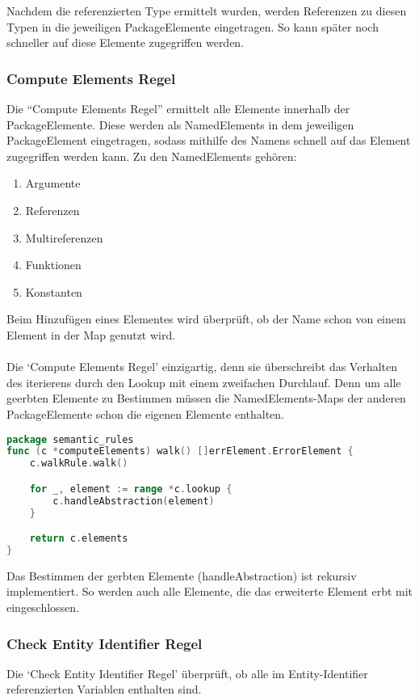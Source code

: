 \documentclass[./einleitung.tex]{subfiles}
\begin{document}
    Nachdem die referenzierten Type ermittelt wurden, werden Referenzen zu diesen Typen in die jeweiligen PackageElemente eingetragen.
    So kann später noch schneller auf diese Elemente zugegriffen werden.

    \subsubsection{Compute Elements Regel}
    Die ``Compute Elements Regel'' ermittelt alle Elemente innerhalb der PackageElemente.
    Diese werden als NamedElements in dem jeweiligen PackageElement eingetragen, sodass mithilfe des Namens schnell auf das Element zugegriffen werden kann.
    Zu den NamedElements gehören:
    \begin{enumerate}
        \item Argumente
        \item Referenzen
        \item Multireferenzen
        \item Funktionen
        \item Konstanten
    \end{enumerate}
    Beim Hinzufügen eines Elementes wird überprüft, ob der Name schon von einem Element in der Map genutzt wird. \\ \\
    Die `Compute Elements Regel' einzigartig, denn sie überschreibt das Verhalten des iterierens durch den Lookup mit einem zweifachen Durchlauf.
    Denn um alle geerbten Elemente zu Bestimmen müssen die NamedElements-Maps der anderen PackageElemente schon die eigenen Elemente enthalten.
    \begin{lstlisting}[language=Go]
package semantic_rules
func (c *computeElements) walk() []errElement.ErrorElement {
	c.walkRule.walk()

	for _, element := range *c.lookup {
		c.handleAbstraction(element)
	}

	return c.elements
}
    \end{lstlisting}
    Das Bestimmen der gerbten Elemente (handleAbstraction) ist rekursiv implementiert.
    So werden auch alle Elemente, die das erweiterte Element erbt mit eingeschlossen.

    \subsubsection{Check Entity Identifier Regel}
    Die `Check Entity Identifier Regel' überprüft, ob alle im Entity-Identifier referenzierten Variablen enthalten sind.
\end{document}
